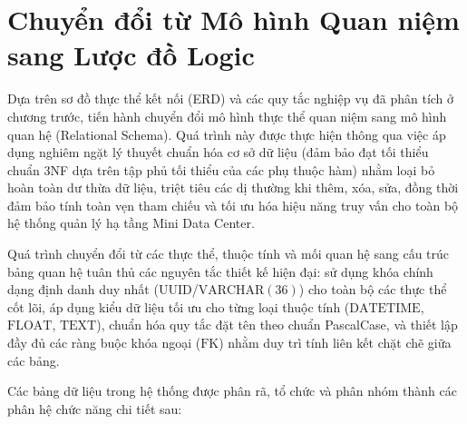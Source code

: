 \section{Chuyển đổi từ Mô hình Quan niệm sang Lược đồ Logic}

Dựa trên sơ đồ thực thể kết nối (ERD) và các quy tắc nghiệp vụ đã phân tích ở chương trước, tiến hành chuyển đổi mô hình thực thể quan niệm sang mô hình quan hệ (Relational Schema). Quá trình này được thực hiện thông qua việc áp dụng nghiêm ngặt lý thuyết chuẩn hóa cơ sở dữ liệu (đảm bảo đạt tối thiểu chuẩn 3NF dựa trên tập phủ tối thiểu của các phụ thuộc hàm) nhằm loại bỏ hoàn toàn dư thừa dữ liệu, triệt tiêu các dị thường khi thêm, xóa, sửa, đồng thời đảm bảo tính toàn vẹn tham chiếu và tối ưu hóa hiệu năng truy vấn cho toàn bộ hệ thống quản lý hạ tầng Mini Data Center.

Quá trình chuyển đổi từ các thực thể, thuộc tính và mối quan hệ sang cấu trúc bảng quan hệ tuân thủ các nguyên tắc thiết kế hiện đại: sử dụng khóa chính dạng định danh duy nhất (UUID/$\text{VARCHAR}(36)$) cho toàn bộ các thực thể cốt lõi, áp dụng kiểu dữ liệu tối ưu cho từng loại thuộc tính ($\text{DATETIME}$, $\text{FLOAT}$, $\text{TEXT}$), chuẩn hóa quy tắc đặt tên theo chuẩn PascalCase, và thiết lập đầy đủ các ràng buộc khóa ngoại ($\text{FK}$) nhằm duy trì tính liên kết chặt chẽ giữa các bảng.

Các bảng dữ liệu trong hệ thống được phân rã, tổ chức và phân nhóm thành các phân hệ chức năng chi tiết sau:

